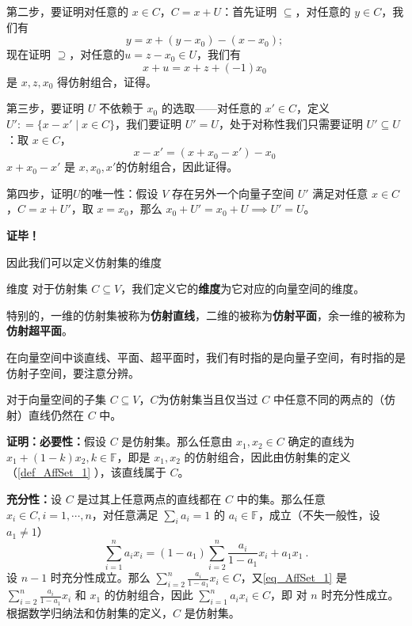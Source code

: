 第二步，要证明对任意的 $x \in C$，$C = x + U$：首先证明 $\subseteq$，对任意的 $y \in C$，我们有
\begin{equation}
y = x + (y - x_0) - (x - x_0); ~
\end{equation}
现在证明 $\supseteq$，对任意的$u  = z - x_0 \in U$，我们有
\begin{equation}
x + u = x + z + (-1) x_0 ~
\end{equation}
是 $x, z, x_0$ 得仿射组合，证得。

第三步，要证明 $U$ 不依赖于 $x_0$ 的选取——对任意的 $x' \in C$，定义 $U': = \{x - x' \mid x \in C\}$，我们要证明 $U' = U$，处于对称性我们只需要证明 $U' \subseteq U$：取 $x \in C$，
\begin{equation}
x - x' = (x + x_0 - x') - x_0 ~
\end{equation}
$x + x_0 - x'$ 是 $x, x_0, x'$的仿射组合，因此证得。

第四步，证明$U$的唯一性：假设 $V$ 存在另外一个向量子空间 $U'$ 满足对任意 $x \in C$，$C = x + U'$，取 $x = x_0$，那么 $x_0 + U' = x_0 + U \implies U' = U$。

\textbf{证毕！}

因此我们可以定义仿射集的维度
\begin{definition}{维度}
对于仿射集 $C \subseteq V$，我们定义它的\textbf{维度}为它对应的向量空间的维度。

特别的，一维的仿射集被称为\textbf{仿射直线}，二维的被称为\textbf{仿射平面}，余一维的被称为\textbf{仿射超平面}。
\end{definition}

在向量空间中谈直线、平面、超平面时，我们有时指的是向量子空间，有时指的是仿射子空间，要注意分辨。

\begin{theorem}{}\label{the_AffSet_1}
对于向量空间的子集 $C \subseteq V$，$C$为仿射集当且仅当过 $C$ 中任意不同的两点的（仿射）直线仍然在 $C$ 中。
\end{theorem}

\textbf{证明：}\textbf{必要性：}假设 $C$ 是仿射集。那么任意由 $x_1,x_2\in C$ 确定的直线为 $x_1+(1-k)x_2,k\in\mathbb F$，即是 $x_1,x_2$ 的仿射组合，因此由仿射集的定义（\autoref{def_AffSet_1} ），该直线属于 $C$。

\textbf{充分性：}设 $C$ 是过其上任意两点的直线都在 $C$ 中的集。那么任意 $x_i\in C,i=1,\cdots ,n$，对任意满足 $\sum_{i}a_i=1$ 的 $a_i\in\mathbb F$，成立（不失一般性，设 $a_1\neq1$）
\begin{equation}\label{eq_AffSet_1}
\sum_{i=1}^n a_ix_i=(1-a_1)\sum_{i=2}^n \frac{a_i}{1-a_1}x_i+a_1x_1~.
\end{equation}
设 $n-1$ 时充分性成立。那么 $\sum_{i=2}^n \frac{a_i}{1-a_1}x_i\in C$，又\autoref{eq_AffSet_1} 是 $\sum_{i=2}^n \frac{a_i}{1-a_1}x_i$ 和 $x_1$ 的仿射组合，因此 $\sum_{i=1}^n a_ix_i\in C$，即 对 $n$ 时充分性成立。根据数学归纳法和仿射集的定义，$C$ 是仿射集。

